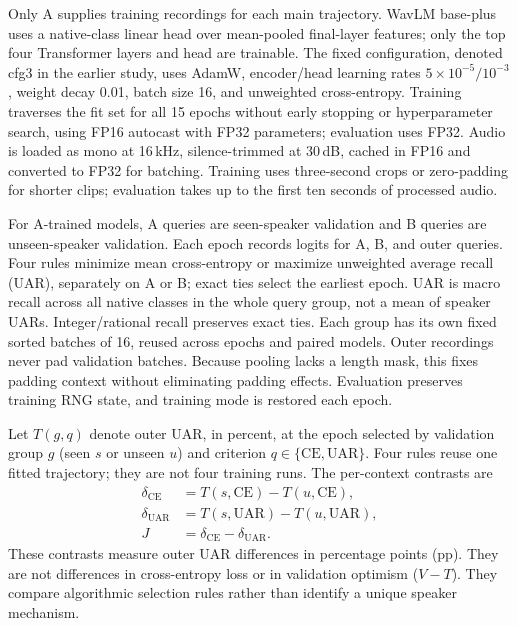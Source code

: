 Only A supplies training recordings for each main trajectory. WavLM
base-plus~\cite{wavlm} uses a native-class linear head over mean-pooled final-layer
features; only the top four Transformer layers and head are trainable.
The fixed configuration, denoted cfg3 in the earlier study, uses AdamW,
encoder/head learning rates $5\times10^{-5}/10^{-3}$, weight decay 0.01,
batch size 16, and unweighted cross-entropy. Training traverses the fit
set for all 15 epochs without early stopping or hyperparameter search,
using FP16 autocast with FP32 parameters; evaluation uses FP32.
Audio is loaded as mono at 16\,kHz, silence-trimmed at 30\,dB, cached
in FP16 and converted to FP32 for batching. Training uses three-second
crops or zero-padding for shorter clips; evaluation takes up to the first
ten seconds of processed audio.

For A-trained models, A queries are seen-speaker validation and B queries
are unseen-speaker validation. Each epoch records logits for A, B, and
outer queries. Four rules minimize mean cross-entropy or maximize
unweighted average recall (UAR), separately on A or B; exact ties select
the earliest epoch. UAR is macro recall across all native classes in the
whole query group, not a mean of speaker UARs. Integer/rational recall
preserves exact ties. Each group has its own fixed sorted batches of 16,
reused across epochs and paired models. Outer recordings never pad
validation batches. Because pooling lacks a length mask, this fixes
padding context without eliminating padding effects. Evaluation preserves
training RNG state, and training mode is restored each epoch.

Let $T(g,q)$ denote outer UAR, in percent, at the epoch selected by
validation group $g$ (seen $s$ or unseen $u$) and criterion
$q\in\{\mathrm{CE},\mathrm{UAR}\}$.
Four rules reuse one fitted trajectory; they are not four training runs.
The per-context contrasts are
\begin{align}
\delta_{\mathrm{CE}} &= T(s,\mathrm{CE})-T(u,\mathrm{CE}),\\
\delta_{\mathrm{UAR}} &= T(s,\mathrm{UAR})-T(u,\mathrm{UAR}),\\
J &= \delta_{\mathrm{CE}}-\delta_{\mathrm{UAR}}.
\end{align}
These contrasts measure outer UAR differences in percentage points (pp).
They are not differences in cross-entropy loss or in validation optimism
($V-T$).
They compare algorithmic selection rules rather than identify a unique
speaker mechanism.

